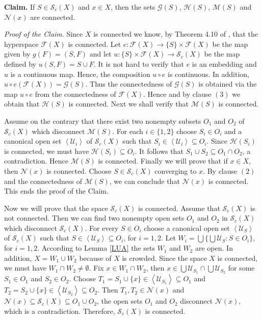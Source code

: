 \documentclass[11pt]{amsart}
\numberwithin{equation}{section}
\theoremstyle{plain}
\theoremstyle{definition}
\theoremstyle{definition}
\theoremstyle{definition}
\theoremstyle{definition}
\theoremstyle{definition}
\begin{document}
 \medskip

\textbf{Claim.} If $S \in \mathcal{S}_c(X)$ and $x \in X$, then the sets $\mathcal{G}(S)$, $\mathcal{H}(S)$, $\mathcal{M}(S)$ and $\mathcal{N}(x)$ are connected.\medskip

    \textit{Proof of the Claim}. Since $X$ is connected we know, by Theorem 4.10 of \cite{emi}, that the hyperspace $\mathcal{F}(X)$ is connected. Let  $e : \mathcal{F}(X) \to \{S\} \times \mathcal{F}(X)$ be the map given by $g(F) = (S,F)$ and let $u : \{S\} \times \mathcal{F}(X) \to \mathcal{S}_c(X)$ be the map defined by $u(S,F) = S \cup F$. It is not hard to verify that $e$ is an embedding and $u$ is a continuous map. Hence, the composition $u \circ e$ is continuous. In addition, $u \circ e (\mathcal{F}(X)) = \mathcal{G}(S)$. Thus the connectedness of $\mathcal{G}(S)$ is obtained via the map $u \circ e$ from the connectedness of $\mathcal{F}(X)$. Hence and by clause $(3)$ we obtain that $\mathcal{H}(S)$ is connected. Next we shall verify that $\mathcal{M}(S)$ is connected.

    \medskip

    Assume on the contrary that there exist two nonempty  subsets $O_1$ and $O_2$ of $\mathcal{S}_c(X)$ which disconnect $\mathcal{M}(S)$. For each $i \in \{1,2\}$ choose $S_i \in O_i$ and a canonical open set $\left\langle \mathcal{U}_i\right\rangle$ of $\mathcal{S}_c(X)$ such that $S_i \in \left\langle \mathcal{U}_i\right\rangle \subseteq O_i$. Since $\mathcal{H}(S_i)$ is connected, we must have $\mathcal{H}(S_i) \subseteq O_i$. It follows that $S_1 \cup S_2 \subseteq O_1 \cap O_2$, a contradiction. Hence $\mathcal{M}(S)$ is connected. Finally we will prove that if $x \in X$, then $\mathcal{N}(x)$ is connected. Choose $S \in \mathcal{S}_c(X)$ converging to $x$. By clause $(2)$ and the connectedness of $\mathcal{M}(S)$,  we can conclude that  $\mathcal{N}(x)$ is connected. This ends the proof of the Claim.\medskip

Now we will prove that the space $\mathcal{S}_c(X)$ is connected. Assume that  $\mathcal{S}_c(X)$ is not connected. Then we can find two nonempty open sets $O_1$ and $O_2$ in $\mathcal{S}_c(X)$ which disconnect $\mathcal{S}_c(X)$. For every $S \in O_i$ choose a canonical open set $\left\langle \mathcal{U}_S\right\rangle$ of $\mathcal{S}_c(X)$ such that $S \in \left\langle \mathcal{U}_S\right\rangle \subseteq O_i$, for $i = 1,2$. Let $W_i = \bigcup\{\bigcup \mathcal{U}_S: S \in O_i\}$, for $i = 1,2$. According to Lemma \ref{LUA} the sets $W_1$ and $W_2$ are open. In addition, $X = W_1 \cup W_2$ because of $X$ is crowded. Since the space $X$ is connected, we must have $W_1 \cap W_2 \not= \emptyset$.  Fix $x \in W_1 \cap W_2$, then $x \in \bigcup\mathcal{U}_{S_1} \cap \bigcup\mathcal{U}_{S_2}$ for some $S_1 \in O_1$ and $S_2 \in O_2$. Choose $T_1 = S_1 \cup\{x\} \in \left\langle \mathcal{U}_{S_1}\right\rangle \subseteq O_1$ and $T_2 =  S_2 \cup\{x\} \in \left\langle \mathcal{U}_{S_2}\right\rangle \subseteq O_2$. Then $T_1,T_2 \in \mathcal{N}(x)$ and  $\mathcal{N}(x) \subseteq \mathcal{S}_c(X) \subseteq O_1 \cup O_2$, the open sets $O_1$ and $O_2$ disconnect $\mathcal{N}(x)$, which is a contradiction. Therefore,  $\mathcal{S}_c(X)$ is connected.
\endproof
\end{document}
